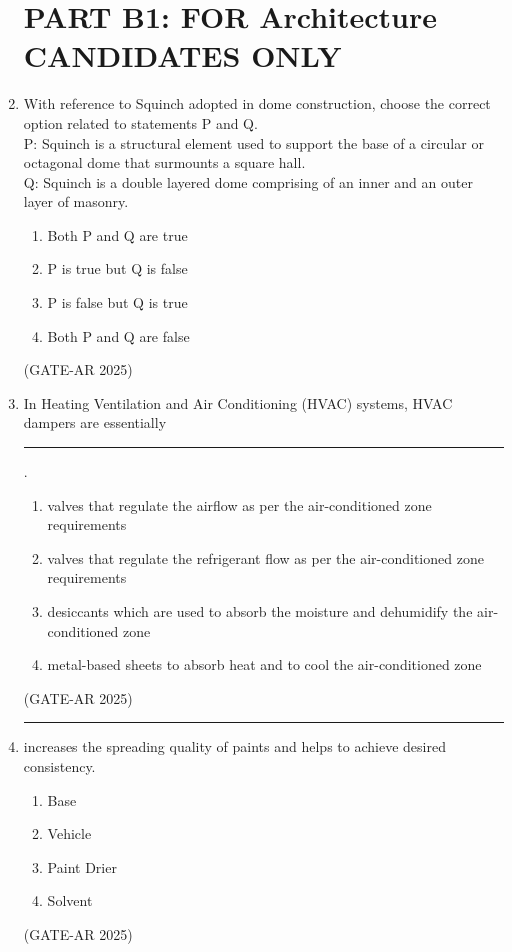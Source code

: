 \documentclass[a4paper,10pt]{article}
\begin{document}
\begin{enumerate}
\section*{PART B1: FOR Architecture CANDIDATES ONLY}

    \item With reference to Squinch adopted in dome construction, choose the correct option related to statements P and Q. \\    
    P: Squinch is a structural element used to support the base of a circular or octagonal dome that surmounts a square hall. \\    
    Q: Squinch is a double layered dome comprising of an inner and an outer layer of masonry.
    \begin{multicols}{2}
    \begin{enumerate}
        \item Both P and Q are true
        \item P is true but Q is false
        \item P is false but Q is true
        \item Both P and Q are false
    \end{enumerate}
    \end{multicols}
    \hfill (GATE-AR 2025)

    \item In Heating Ventilation and Air Conditioning (HVAC) systems, HVAC dampers are essentially \rule{2cm}{0.4pt}.
    \begin{enumerate}
        \item valves that regulate the airflow as per the air-conditioned zone requirements
        \item valves that regulate the refrigerant flow as per the air-conditioned zone requirements
        \item desiccants which are used to absorb the moisture and dehumidify the air-conditioned zone
        \item metal-based sheets to absorb heat and to cool the air-conditioned zone
    \end{enumerate}
    \hfill (GATE-AR 2025)

    \item \rule{2cm}{0.4pt} increases the spreading quality of paints and helps to achieve desired consistency.
    \begin{multicols}{4}
    \begin{enumerate}
        \item Base
        \item Vehicle
        \item Paint Drier
        \item Solvent
    \end{enumerate}
    \end{multicols}
    \hfill (GATE-AR 2025)


\end{enumerate}
\end{document}
